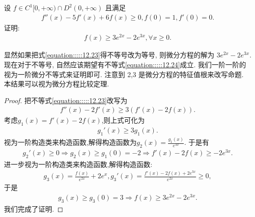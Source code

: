 \documentclass[../../main.tex]{subfiles}%
\begin{document}
\begin{example}
设 $f\in C^1[0,+\infty)\cap D^2(0,+\infty)$ 且满足
\begin{align}
f''(x)-5f'(x)+6f(x)\geqslant0,f(0)=1,f'(0)=0.
\label{equation:::::12.23}
\end{align}
证明:
\begin{align}
f(x)\geqslant3e^{2x}-2e^{3x},\forall x\geqslant0.
\label{equation:::::12.24}
\end{align}
\end{example}
\begin{note}
显然如果把式\eqref{equation:::::12.23}得不等号改为等号, 则微分方程的解为 $3e^{2x}-2e^{3x}$. 现在对于不等号, 自然应该期望有不等式\eqref{equation:::::12.24}成立. 我们一阶一阶的视为一阶微分不等式来证明即可. 注意到 2,3 是微分方程的特征值根来改写命题. 本结果可以视为微分方程比较定理.
\end{note}
\begin{proof}
把不等式\eqref{equation:::::12.23}改写为
\begin{align*}
f''(x)-2f'(x)\geqslant3(f'(x)-2f(x)).
\end{align*}
考虑$g_1(x)=f'(x)-2f(x)$,则上式可化为
\begin{align*}
g_1'(x)\geqslant 3g_1(x).
\end{align*}
视为一阶构造类来构造函数,解得构造函数为$g_2(x)=\frac{g_1(x)}{e^{3x}}$.
于是有
\begin{align*}
g_2'(x)\geqslant0\Rightarrow g_2(x)\geqslant g_1(0)=-2\Rightarrow f'(x)-2f(x)\geqslant -2e^{3x}.
\end{align*}
进一步视为一阶构造类来构造函数,解得构造函数:
\begin{align*}
g_3(x)=\frac{f(x)}{e^{2x}}+2e^{x},g_3'(x)=\frac{f'(x)-2f(x)+2e^{3x}}{e^{2x}}\geqslant0,
\end{align*}
于是
\begin{align*}
g_3(x)\geqslant g_3(0)=3\Rightarrow f(x)\geqslant3e^{2x}-2e^{3x}.
\end{align*}
我们完成了证明. 
\end{proof}
\end{document}
